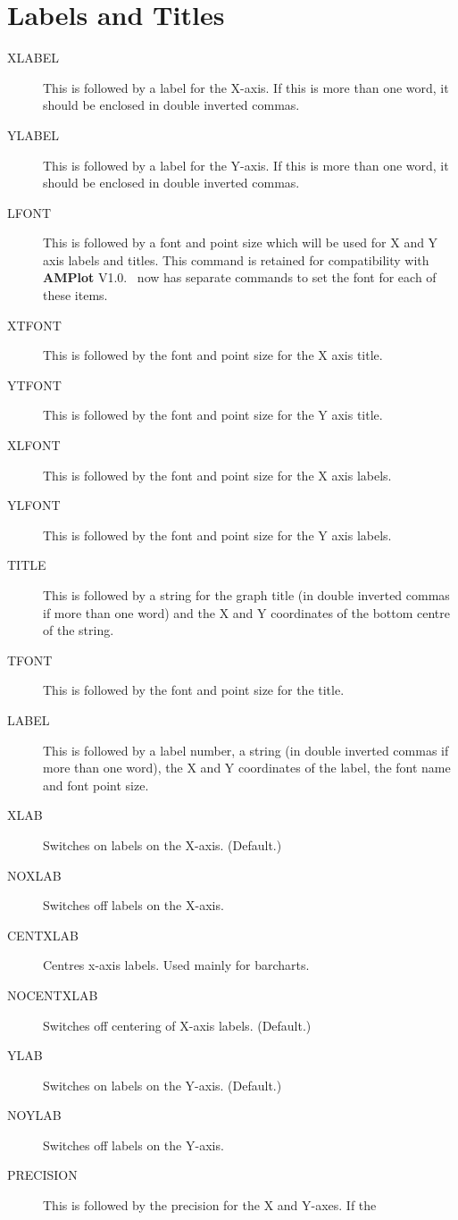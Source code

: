\section{Labels and Titles}
\begin{description}
\item[XLABEL] This is followed by a label for the X-axis. If this is more than 
one word, it should be enclosed in double inverted commas.
\item[YLABEL] This is followed by a label for the Y-axis. If this is more than 
one word, it should be enclosed in double inverted commas.
\item[LFONT] This is followed by a font and point size which will be used for X and Y 
axis labels and titles. This command is retained for compatibility with {\bf AMPlot} 
V1.0. \amplot\ now has separate commands to set the font for each of these items.
\item[XTFONT] This is followed by the font and point size for the X axis title.
\item[YTFONT] This is followed by the font and point size for the Y axis title.
\item[XLFONT] This is followed by the font and point size for the X axis labels.
\item[YLFONT] This is followed by the font and point size for the Y axis labels.
\item[TITLE] This is followed by a string for the graph title (in double inverted 
commas if more than one word) and the X and Y coordinates of the bottom centre of 
the string. 
\item[TFONT] This is followed by the font and point size for the title.
\item[LABEL] This is followed by a label number, a string (in double inverted 
commas if more than one word), the X and Y coordinates of the label, the font
name and font point size. 
\item[XLAB\dag] Switches on labels on the X-axis. (Default.)
\item[NOXLAB] Switches off labels on the X-axis.
\item[CENTXLAB] Centres x-axis labels. Used mainly for barcharts.
\item[NOCENTXLAB\dag] Switches off centering of X-axis labels. (Default.)
\item[YLAB\dag] Switches on labels on the Y-axis. (Default.)
\item[NOYLAB] Switches off labels on the Y-axis.
\item[PRECISION] This is followed by the precision for the X and Y-axes. If the 

\end{description}
